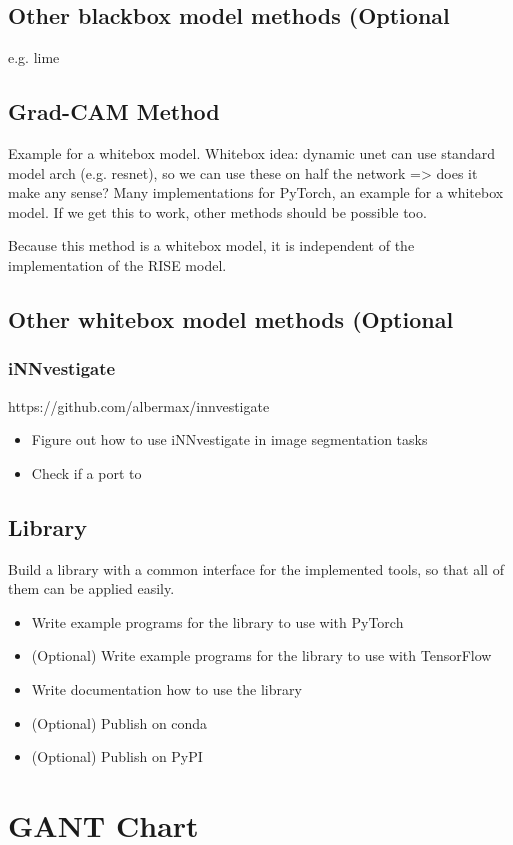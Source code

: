 \subsection{Other blackbox model methods (Optional}
e.g. lime

\subsection{Grad-CAM Method}
Example for a whitebox model. Whitebox idea: dynamic unet can use standard model arch (e.g. resnet), so we can use these on half the network => does it make any sense?
Many implementations for PyTorch, an example for a whitebox model. If we get this to work, other methods should be possible too.

Because this method is a whitebox model, it is independent of the implementation of the RISE model.

\subsection{Other whitebox model methods (Optional}

\subsubsection{iNNvestigate}
https://github.com/albermax/innvestigate

\begin{itemize}
    \item Figure out how to use iNNvestigate in image segmentation tasks
    \item Check if a port to 
\end{itemize}


\subsection{Library}
Build a library with a common interface for the implemented tools, so that all of them can be applied easily.
\begin{itemize}
    \item Write example programs for the library to use with PyTorch
    \item (Optional) Write example programs for the library to use with TensorFlow
    \item Write documentation how to use the library
    \item (Optional) Publish on conda
    \item (Optional) Publish on PyPI
    
\end{itemize}

\section{GANT Chart}
